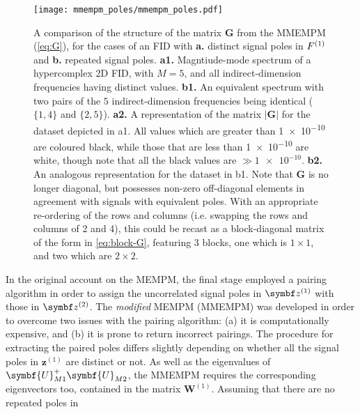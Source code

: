 \begin{figure}
    \centering
    \texttt{[image: mmempm\_poles/mmempm\_poles.pdf]}
    \caption[
        A comparison of the structure of the matrix $\symbf{G}$ from the
        \acs{MMEMPM}, for the cases of an \acs{FID} with distinct and repeated
        signal poles in $\Fone$.
    ]{
        A comparison of the structure of the matrix $\symbf{G}$ from the
        \acs{MMEMPM} (\cref{eq:G}), for the cases of an \acs{FID} with \textbf{a.} distinct
        signal poles in $\Fone$ and \textbf{b.} repeated signal poles.
        \textbf{a1.} Magntiude-mode spectrum of a hypercomplex \ac{2D}
        \ac{FID}, with $M=5$, and all indirect-dimension frequencies having
        distinct values.
        \textbf{b1.} An equivalent spectrum with two pairs of the $5$
        indirect-dimension frequencies being identical ($\lbrace 1, 4 \rbrace$
        and  $\lbrace 2, 5 \rbrace$).
        \textbf{a2.} A representation of the matrix
        $\lvert \symbf{G} \rvert$ for the dataset depicted in a1. All values
        which are greater than \num{1e-10} are coloured black, while those that
        are less than \num{1e-10} are white, though note that all the black
        values are $\gg \num{1e-10}$.
        \textbf{b2.} An analogous representation for the dataset in b1. Note
        that $\symbf{G}$ is no longer diagonal, but possesses non-zero
        off-diagonal elements in agreement with signals with equivalent poles.
        With an appropriate re-ordering of the rows and columns (i.e. swapping
        the rows and columns of 2 and 4), this could be recast as a
        block-diagonal matrix of the form in \cref{eq:block-G}, featuring 3
        blocks, one which is $1 \times 1$, and two which are  $2 \times 2$.
    }
    \label{fig:mmempm-poles}
\end{figure}
In the original account on the \ac{MEMPM}, the final stage employed a
pairing algorithm in order to assign the uncorrelated signal poles in $\bdzone$
with those in $\bdztwo$\cite{Hua1992}. The \emph{modified} \ac{MEMPM} (\acs{MMEMPM}) was
developed in order to overcome two issues with the pairing algorithm: (a) it is
computationally expensive, and (b) it is prone to return incorrect
pairings\cite{Chen2007}.
The procedure for extracting the paired poles differs slightly depending on
whether all the signal poles in $\symbf{z}^{(1)}$ are distinct or not.
As well as the eigenvalues of
$\symbf{U}^{+}_{M1}\symbf{U}_{M2}^{\vphantom{+}}$, the \ac{MMEMPM} requires
the corresponding eigenvectors too, contained in the matrix
$\symbf{W}^{(1)}$. Assuming that there are no repeated poles in
